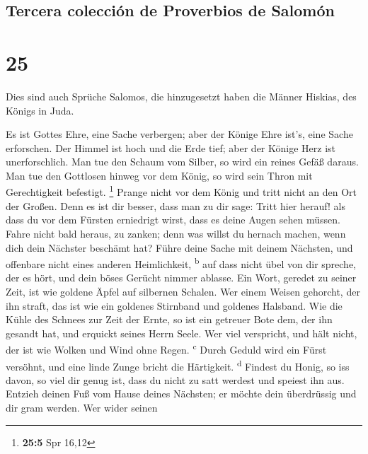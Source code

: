 \hypertarget{tercera-colecciuxf3n-de-proverbios-de-salomuxf3n}{%
\subsection{Tercera colección de Proverbios de
Salomón}\label{tercera-colecciuxf3n-de-proverbios-de-salomuxf3n}}

\hypertarget{section-24}{%
\section{25}\label{section-24}}

 Dies sind auch Sprüche Salomos, die hinzugesetzt haben
die Männer Hiskias, des Königs in Juda.

 Es ist Gottes Ehre, eine Sache verbergen; aber der Könige
Ehre ist's, eine Sache erforschen.  Der Himmel ist hoch
und die Erde tief; aber der Könige Herz ist unerforschlich.
 Man tue den Schaum vom Silber, so wird ein reines Gefäß
daraus.  Man tue den Gottlosen hinweg vor dem König, so
wird sein Thron mit Gerechtigkeit befestigt. \footnote{\textbf{25:5} Spr
  16,12}  Prange nicht vor dem König und tritt nicht an
den Ort der Großen.  Denn es ist dir besser, dass man zu
dir sage: Tritt hier herauf! als dass du vor dem Fürsten erniedrigt
wirst, dass es deine Augen sehen müssen.  Fahre nicht bald
heraus, zu zanken; denn was willst du hernach machen, wenn dich dein
Nächster beschämt hat?  Führe deine Sache mit deinem
Nächsten, und offenbare nicht eines anderen Heimlichkeit,
\textsuperscript{b}  auf dass nicht übel von dir spreche,
der es hört, und dein böses Gerücht nimmer ablasse.  Ein
Wort, geredet zu seiner Zeit, ist wie goldene Äpfel auf silbernen
Schalen.  Wer einem Weisen gehorcht, der ihn straft, das
ist wie ein goldenes Stirnband und goldenes Halsband. 
Wie die Kühle des Schnees zur Zeit der Ernte, so ist ein getreuer Bote
dem, der ihn gesandt hat, und erquickt seines Herrn Seele.
 Wer viel verspricht, und hält nicht, der ist wie Wolken
und Wind ohne Regen. \textsuperscript{c}  Durch Geduld
wird ein Fürst versöhnt, und eine linde Zunge bricht die Härtigkeit.
\textsuperscript{d}  Findest du Honig, so iss davon, so
viel dir genug ist, dass du nicht zu satt werdest und speiest ihn aus.
 Entzieh deinen Fuß vom Hause deines Nächsten; er möchte
dein überdrüssig und dir gram werden.  Wer wider seinen
